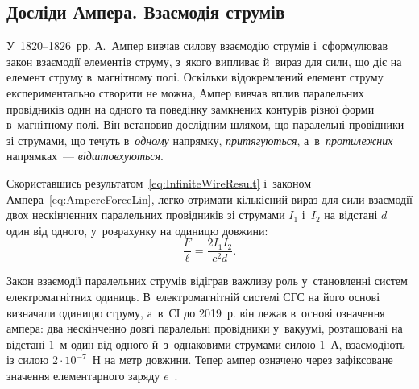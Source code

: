 \begin{center}
\end{center}


\subsection*{Досліди Ампера. Взаємодія струмів}


У~1820--1826~рр. А.~Ампер вивчав силову взаємодію струмів і~сформулював закон взаємодії
елементів струму, з~якого випливає й~вираз для сили, що діє на елемент струму в~магнітному
полі. Оскільки відокремлений елемент струму експериментально створити не можна, Ампер
вивчав вплив паралельних провідників один на одного та поведінку замкнених контурів різної
форми в~магнітному полі. Він встановив дослідним шляхом, що паралельні провідники зі
струмами, що течуть в~\emph{одному} напрямку, \emph{притягуються},
а~в~\emph{протилежних} напрямках~--- \emph{відштовхуються}.


Скориставшись результатом~\eqref{eq:InfiniteWireResult} і~законом
Ампера~\eqref{eq:AmpereForceLin}, легко отримати кількісний вираз для сили взаємодії двох
нескінченних паралельних провідників зі струмами $I_1$ і~$I_2$ на відстані $d$ один від
одного, у~розрахунку на одиницю довжини:
\begin{equation}\label{eq:AmpereParallelWires}
	\frac{F}{\ell} = \frac{2I_1I_2}{c^2 d}.
\end{equation}

\begin{Historical}[unbreakable]
	Закон взаємодії паралельних струмів відіграв важливу роль у~становленні систем
	електромагнітних одиниць. В~електромагнітній системі СГС на його основі визначали
	одиницю струму, а~в~СІ до 2019~р. він лежав в~основі означення ампера: два нескінченно
	довгі паралельні провідники у~вакуумі, розташовані на відстані $1$~м один від одного
	й~з~однаковими струмами силою $1$~А, взаємодіють із силою $2\cdot10^{-7}$~Н на метр
	довжини. Тепер ампер означено через зафіксоване значення елементарного заряду $e$~\cite{BIPMAmpere}.
\end{Historical}




